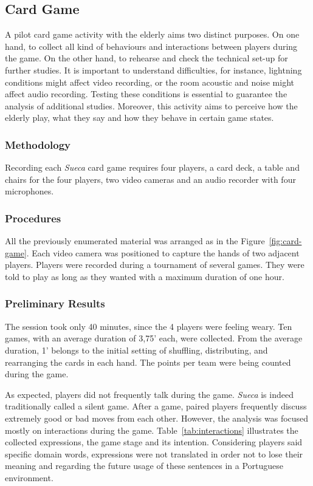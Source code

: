\subsection{Card Game}

A pilot card game activity with the elderly aims two distinct purposes.
On one hand, to collect all kind of behaviours and interactions between players during the game.
On the other hand, to rehearse and check the technical set-up for further studies.
It is important to understand difficulties, for instance, lightning conditions might affect video recording, or the room acoustic and noise might affect audio recording.
Testing these conditions is essential to guarantee the analysis of additional studies.
Moreover, this activity aims to perceive how the elderly play, what they say and how they behave in certain game states.

\subsubsection{Methodology}
Recording each \emph{Sueca} card game requires four players, a card deck, a table and chairs for the four players, two video cameras and an audio recorder with four microphones.

\subsubsection{Procedures}
All the previously enumerated material was arranged as in the Figure~\ref{fig:card-game}.
Each video camera was positioned to capture the hands of two adjacent players.
Players were recorded during a tournament of several games.
They were told to play as long as they wanted with a maximum duration of one hour.

\subsubsection{Preliminary Results}
The session took only 40 minutes, since the 4 players were feeling weary.
Ten games, with an average duration of 3,75' each, were collected.
From the average duration, 1' belongs to the initial setting of shuffling, distributing, and rearranging the cards in each hand.
The points per team were being counted during the game.

As expected, players did not frequently talk during the game.
\emph{Sueca} is indeed traditionally called a silent game.
After a game, paired players frequently discuss extremely good or bad moves from each other.
However, the analysis was focused mostly on interactions during the game.
Table~\ref{tab:interactions} illustrates the collected expressions, the game stage and its intention.
Considering players said specific domain words, expressions were not translated in order not to lose their meaning and regarding the future usage of these sentences in a Portuguese environment.


